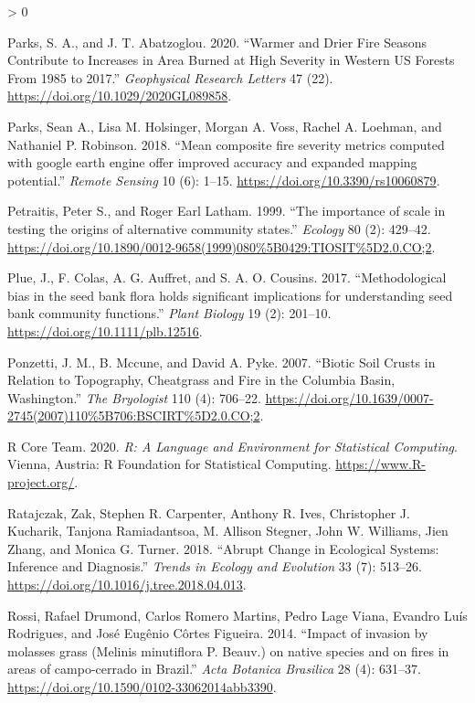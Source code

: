 \documentclass[
  12pt,
]{article}
\newlength{\cslhangindent}
\newenvironment{CSLReferences}[2] %
 {%
  \setlength{\parindent}{0pt}
  \ifodd #1 \everypar{\setlength{\hangindent}{\cslhangindent}}\ignorespaces\fi
  \ifnum #2 > 0
  \setlength{\parskip}{#2\baselineskip}
  \fi
 }%
 {}
\begin{document}
\begin{CSLReferences}{1}{0}
\leavevmode\hypertarget{ref-Parks2020}{}%
Parks, S. A., and J. T. Abatzoglou. 2020. {``Warmer and {Drier} {Fire}
{Seasons} {Contribute} to {Increases} in {Area} {Burned} at {High}
{Severity} in {Western} {US} {Forests} {From} 1985 to 2017.''}
\emph{Geophysical Research Letters} 47 (22).
\url{https://doi.org/10.1029/2020GL089858}.

\leavevmode\hypertarget{ref-Parks2018}{}%
Parks, Sean A., Lisa M. Holsinger, Morgan A. Voss, Rachel A. Loehman,
and Nathaniel P. Robinson. 2018. {``{Mean composite fire severity
metrics computed with google earth engine offer improved accuracy and
expanded mapping potential}.''} \emph{Remote Sensing} 10 (6): 1--15.
\url{https://doi.org/10.3390/rs10060879}.

\leavevmode\hypertarget{ref-Petraitis1999}{}%
Petraitis, Peter S., and Roger Earl Latham. 1999. {``{The importance of
scale in testing the origins of alternative community states}.''}
\emph{Ecology} 80 (2): 429--42.
\url{https://doi.org/10.1890/0012-9658(1999)080\%5B0429:TIOSIT\%5D2.0.CO;2}.

\leavevmode\hypertarget{ref-Plue2017}{}%
Plue, J., F. Colas, A. G. Auffret, and S. A. O. Cousins. 2017.
{``{Methodological bias in the seed bank flora holds significant
implications for understanding seed bank community functions}.''}
\emph{Plant Biology} 19 (2): 201--10.
\url{https://doi.org/10.1111/plb.12516}.

\leavevmode\hypertarget{ref-Ponzetti2007}{}%
Ponzetti, J. M., B. Mccune, and David A. Pyke. 2007. {``Biotic Soil
Crusts in Relation to Topography, Cheatgrass and Fire in the {Columbia}
{Basin}, {Washington}.''} \emph{The Bryologist} 110 (4): 706--22.
\url{https://doi.org/10.1639/0007-2745(2007)110\%5B706:BSCIRT\%5D2.0.CO;2}.

\leavevmode\hypertarget{ref-R}{}%
R Core Team. 2020. \emph{R: A Language and Environment for Statistical
Computing}. Vienna, Austria: R Foundation for Statistical Computing.
\url{https://www.R-project.org/}.

\leavevmode\hypertarget{ref-Ratajczak2018}{}%
Ratajczak, Zak, Stephen R. Carpenter, Anthony R. Ives, Christopher J.
Kucharik, Tanjona Ramiadantsoa, M. Allison Stegner, John W. Williams,
Jien Zhang, and Monica G. Turner. 2018. {``{Abrupt Change in Ecological
Systems: Inference and Diagnosis}.''} \emph{Trends in Ecology and
Evolution} 33 (7): 513--26.
\url{https://doi.org/10.1016/j.tree.2018.04.013}.

\leavevmode\hypertarget{ref-Rossi2014}{}%
Rossi, Rafael Drumond, Carlos Romero Martins, Pedro Lage Viana, Evandro
Luís Rodrigues, and José Eugênio Côrtes Figueira. 2014. {``{Impact of
invasion by molasses grass (Melinis minutiflora P. Beauv.) on native
species and on fires in areas of campo-cerrado in Brazil}.''} \emph{Acta
Botanica Brasilica} 28 (4): 631--37.
\url{https://doi.org/10.1590/0102-33062014abb3390}.


\end{CSLReferences}
\end{document}
